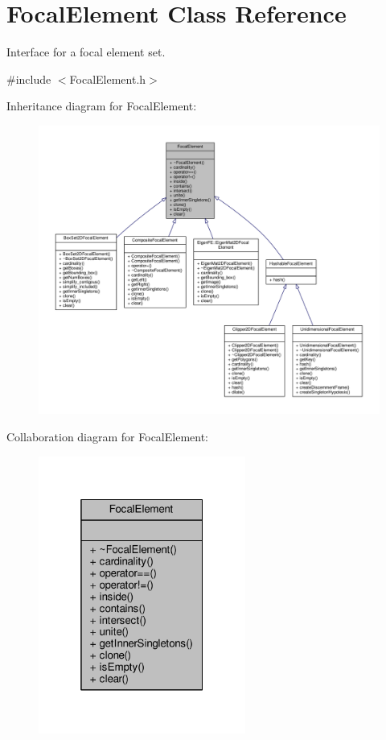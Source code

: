 \hypertarget{classFocalElement}{}\section{Focal\+Element Class Reference}
\label{classFocalElement}


Interface for a focal element set.  




{\ttfamily \#include $<$Focal\+Element.\+h$>$}



Inheritance diagram for Focal\+Element\+:\nopagebreak
\begin{figure}[H]
\begin{center}
\leavevmode
\includegraphics[width=350pt]{classFocalElement__inherit__graph}
\end{center}
\end{figure}


Collaboration diagram for Focal\+Element\+:\nopagebreak
\begin{figure}[H]
\begin{center}
\leavevmode
\includegraphics[width=193pt]{classFocalElement__coll__graph}
\end{center}
\end{figure}
